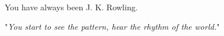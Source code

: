 You have always been J. K. Rowling.

"\emph{You start to see the pattern, hear the rhythm of the world.}"

